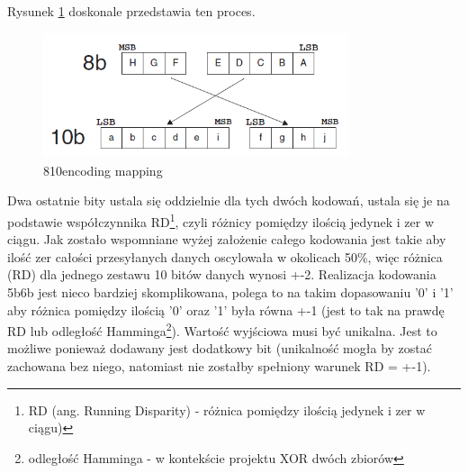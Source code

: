 \documentclass{BscUS}
\begin{document}
Rysunek \ref{fig:810mapping} doskonale przedstawia ten proces.
\begin{figure}[H]
\centering
\includegraphics[width=0.8\textwidth]{./img/mapping810}
\caption{810encoding mapping}
\label{fig:810mapping}
\end{figure}

Dwa ostatnie bity ustala się oddzielnie dla tych dwóch kodowań, ustala się je na podstawie współczynnika RD\footnote{RD (ang. Running Disparity) - różnica pomiędzy ilością jedynek i zer w ciągu)}, czyli różnicy pomiędzy ilością jedynek i zer w ciągu. Jak zostało wspomniane wyżej założenie całego kodowania jest takie aby ilość zer całości przesyłanych danych oscylowała w okolicach 50\%, więc różnica (RD) dla jednego zestawu 10 bitów danych wynosi +-2.
\newline
\indent Realizacja kodowania 5b\/6b jest nieco bardziej skomplikowana, polega to na takim dopasowaniu '0' i '1' aby różnica pomiędzy ilością '0' oraz '1' była równa +-1 (jest to tak na prawdę RD lub odległość Hamminga\footnote{odległość Hamminga - w kontekście projektu XOR dwóch zbiorów}). Wartość wyjściowa musi być unikalna. Jest to możliwe ponieważ dodawany jest dodatkowy bit (unikalność mogła by zostać zachowana bez niego, natomiast nie zostałby spełniony warunek RD = +-1).
\newline 
\end{document}
